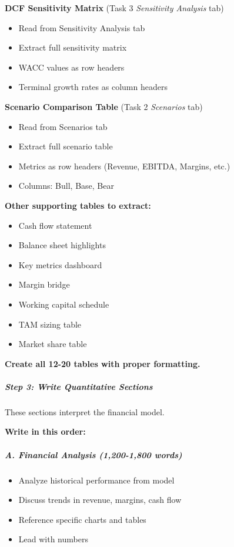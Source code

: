 \documentclass[11pt]{article}
\begin{document}
\textbf{DCF Sensitivity Matrix} (Task 3 \emph{Sensitivity Analysis} tab)

\begin{itemize}[leftmargin=*,itemsep=2pt,topsep=2pt]
\item {} Read from Sensitivity Analysis tab
\item {} Extract full sensitivity matrix
\item {} WACC values as row headers
\item {} Terminal growth rates as column headers
\end{itemize}

\textbf{Scenario Comparison Table} (Task 2 \emph{Scenarios} tab)

\begin{itemize}[leftmargin=*,itemsep=2pt,topsep=2pt]
\item {} Read from Scenarios tab
\item {} Extract full scenario table
\item {} Metrics as row headers (Revenue, EBITDA, Margins, etc.)
\item {} Columns: Bull, Base, Bear
\end{itemize}

\textbf{Other supporting tables to extract:}

\begin{itemize}[leftmargin=*,itemsep=2pt,topsep=2pt]
\item {} Cash flow statement
\item {} Balance sheet highlights
\item {} Key metrics dashboard
\item {} Margin bridge
\item {} Working capital schedule
\item {} TAM sizing table
\item {} Market share table
\end{itemize}

\textbf{Create all 12-20 tables with proper formatting.}


\subparagraph{Step 3: Write Quantitative Sections}\mbox{}\par

These sections interpret the financial model.


\textbf{Write in this order:}


\subparagraph{A. Financial Analysis (1,200-1,800 words)}\mbox{}\par
\begin{itemize}[leftmargin=*,itemsep=2pt,topsep=2pt]
\item {} Analyze historical performance from model
\item {} Discuss trends in revenue, margins, cash flow
\item {} Reference specific charts and tables
\item {} Lead with numbers
\end{itemize}
\end{document}
